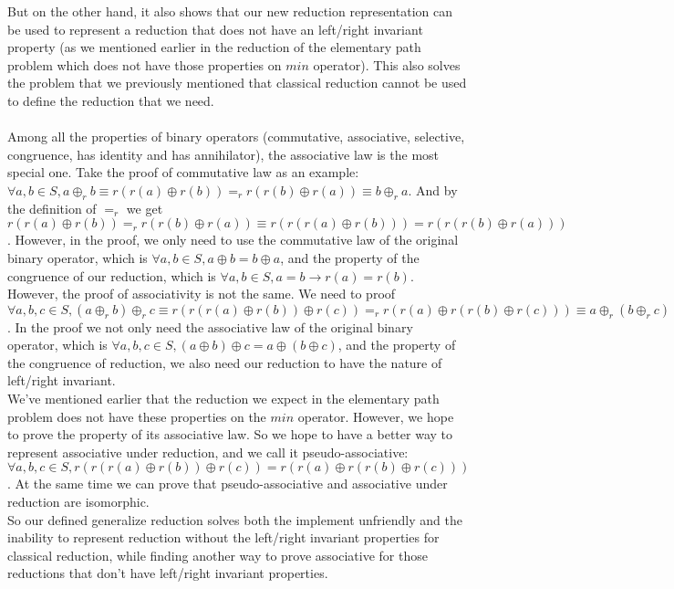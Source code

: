 \documentclass[a4paper,10pt]{article}
\begin{document}
But on the other hand, it also shows that our new reduction representation can be used to represent a reduction that does not have an left/right invariant property (as we mentioned earlier in the reduction of the elementary path problem which does not have those properties on $min$ operator).
This also solves the problem that we previously mentioned that classical reduction cannot be used to define the reduction that we need.\\\\
Among all the properties of binary operators 
(commutative, associative, selective, congruence, has identity and has annihilator), the associative law is the most special one. 
Take the proof of commutative law as an example:\\
$\forall a,b \in S, a \oplus_r b \equiv  r(r (a) \oplus r(b)) =_r r(r (b) \oplus r(a)) \equiv b \oplus_r a$. And by the definition of $=_r$ we get $r(r (a) \oplus r(b)) =_r r(r (b) \oplus r(a)) \equiv r(r(r (a) \oplus r(b))) = r(r(r (b) \oplus r(a)))$. 
However, in the proof, we only need to use the commutative law of the original binary operator, which is $\forall a,b \in S, a \oplus b = b \oplus a$, and the property of the congruence of our reduction, which is $\forall a,b \in S, a = b \rightarrow r(a) = r(b)$. However, the proof of associativity is not the same. We need to proof $\forall a,b,c \in S, (a \oplus_r b) \oplus_r c  \equiv  r(r(r (a) \oplus r(b)) \oplus r(c)) =_r r(r (a) \oplus r(r(b) \oplus r(c))) \equiv a\oplus_r (b \oplus_r c)$. In the proof we not only need the associative law of the original binary operator, which is $\forall a,b,c \in S, (a\oplus b) \oplus c = a \oplus (b\oplus c)$, and the property of the congruence of reduction, we also need our reduction to have the nature of left/right invariant.\\
We've mentioned earlier that the reduction we expect in the elementary path problem does not have these properties on the $min$ operator. However, we hope to prove the property of its associative law. So we hope to have a better way to represent associative under reduction, and we call it pseudo-associative: $\forall a,b,c \in S, r(r(r(a)\oplus r(b)) \oplus r(c)) = r(r(a) \oplus r(r(b)\oplus r(c)))$. At the same time we can prove that pseudo-associative and associative under reduction are isomorphic.\\
So our defined generalize reduction solves both the implement unfriendly and the inability to represent reduction without the left/right invariant properties for classical reduction, while finding another way to prove associative for those reductions that don't have left/right invariant properties.\\\\
\end{document}
